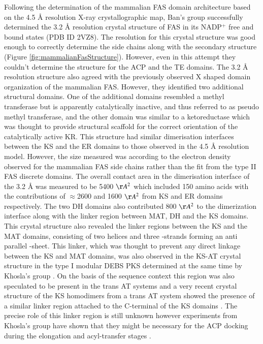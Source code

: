 		Following the determination of the mammalian FAS domain architecture based on the 4.5 \AA{} resolution X-ray crystallographic map, Ban's group successfully determined the 3.2 \AA{} resolution crystal structure of FAS in its NADP$ ^{+} $ free and bound states (PDB ID 2VZ8). The resolution for this crystal structure was good enough to correctly determine the side chains along with the secondary structure (Figure \ref{fig:mammalianFasStructure}). However, even in this attempt they couldn't determine the structure for the ACP and the TE domains. The 3.2 \AA{} resolution structure also agreed with the previously observed X shaped domain organization of the mammalian FAS. However, they identified two additional structural domains. One of the additional domains resembled a methyl transferase but is apparently catalytically inactive, and thus referred to as pseudo methyl transferase, and the other domain was similar to a ketoreductase which was thought to provide structural scaffold for the correct orientation of the catalytically active KR. This structure had similar dimerisation interfaces between the KS and the ER domains to those observed in the 4.5 \AA{} resolution model. However, the size measured was according to the electron density observed for the mammalian FAS side chains rather than the fit from the type II FAS discrete domains. The overall contact area in the dimerisation interface of the 3.2 \AA{} was measured to be 5400 $ \AA{}^{2} $ which included 150 amino acids with the contributions of $\approx$2600 and 1600 $ \AA{}^{2} $ from KS and ER domains respectively. The two DH domains also contributed 800 $ \AA{}^{2} $ to the dimerization interface along with the linker region between MAT, DH and the KS domains. This crystal structure also revealed the linker regions between the KS and the MAT domains, consisting of two helices and three \bet-strands forming an anti parallel \bet-sheet. This linker, which was thought to prevent any direct linkage between the KS and MAT domains, was also observed in the KS-AT crystal structure in the type I modular DEBS PKS determined at the same time by Khosla's group \parencite{Tang2006, Tang2007}. On the basis of the sequence context this region was also speculated to be present in the trans AT systems and a very recent crystal structure of the KS homodimers from a trans AT system showed the presence of a similar linker region attached to the C-terminal of the KS domains \parencite{Gay2014}. The precise role of this linker region is still unknown however experiments from Khosla's group have shown that they might be necessary for the ACP docking during the elongation and acyl-transfer stages \parencite{Kapur2010}. 
		
